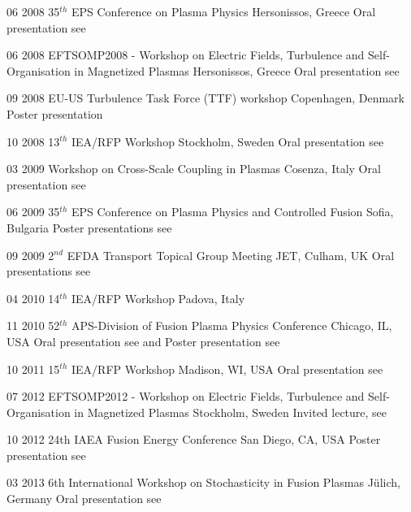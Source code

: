 {\begin{entrylist}
\entry
{06 2008}
{35$^{th}$ EPS Conference on Plasma Physics} 
{Hersonissos, Greece} 
{Oral presentation see \cite{vianello:eps2008}}

\entry
{06 2008} 
{EFTSOMP2008 - Workshop on Electric Fields, Turbulence and Self-Organisation in Magnetized Plasmas} 
{Hersonissos, Greece} 
{Oral presentation see \cite{vianello:eftsomp08}}

\entry
{09 2008} 
{EU-US Turbulence Task Force (TTF) workshop}
{Copenhagen, Denmark} 
{Poster presentation}

\entry
{10 2008} 
{13$^{th}$ IEA/RFP Workshop} 
{Stockholm, Sweden} 
{Oral presentation see \cite{vianello:rfp08}}

\entry
{03 2009} 
{Workshop on Cross-Scale Coupling in Plasmas}
{Cosenza, Italy }
{Oral presentation see \cite{vianello:cross}}

\entry
{06 2009} 
{35$^{th}$ EPS Conference on Plasma Physics and
 Controlled Fusion} 
{Sofia, Bulgaria} 
{Poster presentations see \cite{vianello:eps2009-rfx,
    vianello:eps2009-asdex}}

\entry
{09 2009} 
{2$^{nd}$ EFDA Transport Topical Group Meeting} 
{JET, Culham, UK} 
{Oral presentations see \cite{vianello:efda09, vianello:efda09b}}

\entry
{04 2010}
{14$^{th}$ IEA/RFP Workshop} 
{Padova, Italy}
{}

\entry
{11 2010} 
{52$^{th}$ APS-Division of Fusion Plasma Physics Conference}
{Chicago, IL, USA}
{Oral presentation see \cite{vianello:dpp2010} and Poster presentation
see \cite{vianello:dpp2010b}}

\entry
{10 2011} 
{15$^{th}$ IEA/RFP Workshop} 
{Madison, WI,  USA}
{Oral presentation see \cite{vianello:rfp2011}}

\entry
{07 2012}
{EFTSOMP2012 - Workshop on Electric Fields, Turbulence and
  Self-Organisation in Magnetized Plasmas}
{Stockholm, Sweden}
{Invited lecture,  see \cite{vianello:eftsomp2012}}

\entry
{10 2012} 
{24th IAEA Fusion Energy Conference} 
{San Diego, CA, USA}
{Poster presentation see \cite{Vianello:2012uh}}

\entry
{03 2013}
{6th International Workshop on Stochasticity in Fusion Plasmas} 
{J{\"u}lich, Germany}
{Oral presentation see \cite{vianello:sfp2013}}



\end{entrylist}}
